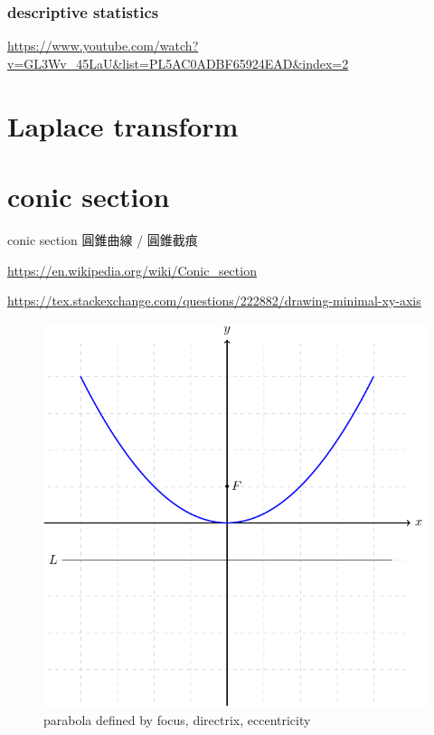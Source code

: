 \documentclass[
]{book}
\theoremstyle{definition}
\theoremstyle{definition}
\theoremstyle{definition}
\theoremstyle{definition}
\theoremstyle{remark}
\begin{document}
\hypertarget{descriptive-statistics}{%
\subsection{descriptive statistics}\label{descriptive-statistics}}

\url{https://www.youtube.com/watch?v=GL3Wv_45LaU\&list=PL5AC0ADBF65924EAD\&index=2}

\hypertarget{laplace-transform}{%
\chapter{Laplace transform}\label{laplace-transform}}

\hypertarget{conic-section}{%
\chapter{conic section}\label{conic-section}}

\begin{CJK}{UTF8}{bsmi}
conic section 圓錐曲線 / 圓錐截痕
\end{CJK}

\url{https://en.wikipedia.org/wiki/Conic_section}

\url{https://tex.stackexchange.com/questions/222882/drawing-minimal-xy-axis}

\begin{figure}
\includegraphics[width=0.75\linewidth]{202402252333-conic-section_files/figure-latex/unnamed-chunk-1-1} \caption{parabola defined by focus, directrix, eccentricity}\label{fig:unnamed-chunk-1}
\end{figure}
\end{document}
